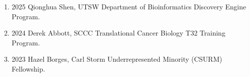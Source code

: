 \begin{enumerate}
[leftmargin=!,
 labelindent=0pt,
 itemindent=-66pt,
 label=\textbullet]

\item 2025
\hspace{8pt}
Qionghua Shen, UTSW Department of Bioinformatics Discovery Engine Program. \\

\item 2024
\hspace{8pt}
Derek Abbott, SCCC Translational Cancer Biology T32 Training Program. \\

\item 2023
\hspace{8pt}
Hazel Borges, Carl Storm Underrepresented Minority (CSURM) Fellowship. \\

\end{enumerate}

